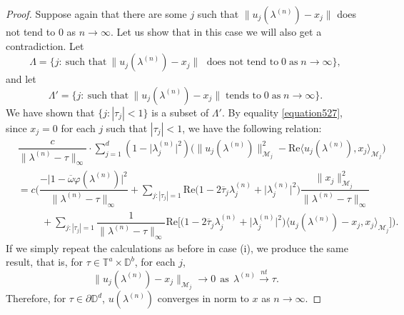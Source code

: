 \documentclass[11pt, reqno]{amsart}
\newcommand\1{\boldsymbol {1}}
\numberwithin{equation}{section}
\begin{document}
\begin{proof}
 Suppose again that there are some $j$ such that 
$\|u_{j}(\lambda^{(n)}) - x_j\|$ does not tend to $0$  as $n\rightarrow \infty$. Let us show that in this case we will also get a contradiction.
Let $$\Lambda = \{ j: \ \text{such that} \ \|u_{j}(\lambda^{(n)}) - x_j\| \; \text{ does not tend to} \; 0 \; \text{as} \; n\rightarrow \infty \},$$
and let $$\Lambda'= \{ j: \ \text{such that} \ \|u_{j}(\lambda^{(n)}) - x_j\| \; \text{tends to} \; 0 \; \text{as} \; n \rightarrow \infty \}.$$
We have shown that $\{ j : |\tau_j| < 1 \}$ is a subset of $\Lambda'$. By equality \eqref{equation527},
since $x_j=0$ for each $j$ such that $|\tau_j| < 1$, we have the following relation:
\begin{align}\label{equation527notTd}
& \dfrac{c}{\|\lambda^{(n)}-\tau\|_{\infty}}\cdot\sum_{j=1}^{d}(1-\lvert \lambda^{(n)}_{j} \rvert^{2})\Big(\|u_{j}(\lambda^{(n)})\|_{\mathcal{M}_{j}}^{2}-\mathrm{Re} \langle u_{j}(\lambda^{(n)}),x_{j}\rangle_{\mathcal{M}_{j}} \Big)\nonumber\\
&=c\Bigg(\dfrac{-\lvert1-\overline{\omega}\varphi(\lambda^{(n)})\rvert^{2}}{\|\lambda^{(n)}-\tau\|_{\infty}}+\sum_{j: |\tau_j| =1}\mathrm{Re}\Big(1-2\overline{\tau}_{j}\lambda^{(n)}_{j}+\lvert\lambda^{(n)}_{j}\rvert^{2}\Big)\dfrac{\|x_{j}\|_{\mathcal{M}_{j}}^{2}}{\|\lambda^{(n)}-\tau\|_{\infty}}\nonumber\\
&\hspace{1cm}+\sum_{j: |\tau_j| =1}\dfrac{1}{\|\lambda^{(n)}-\tau\|_{\infty}}\mathrm{Re}\bigg[
\Big(1-2\overline{\tau}_{j}\lambda^{(n)}_{j}+\lvert\lambda^{(n)}_{j}\rvert^{2}\Big)\langle u_{j}(\lambda^{(n)})-x_{j},x_{j}\rangle_{\mathcal{M}_{j}}\bigg]\Bigg).
\end{align}
If we simply repeat the calculations as before in  case (i), we produce the same result, that is, for $\tau\in\mathbb{T}^{a}\times\mathbb{D}^{b}$, for each $j$,
$$\|u_{j}(\lambda^{(n)})- x_{j}\|_{\mathcal{M}_{j}}\rightarrow 0~~\text{as}~~\lambda^{(n)}{\overset{nt}\rightarrow}\tau.$$
Therefore, for $\tau\in\partial\mathbb{D}^{d}$, $u(\lambda^{(n)})$ converges in norm to $x$ as $n \rightarrow \infty$.
\end{proof}
\end{document}
